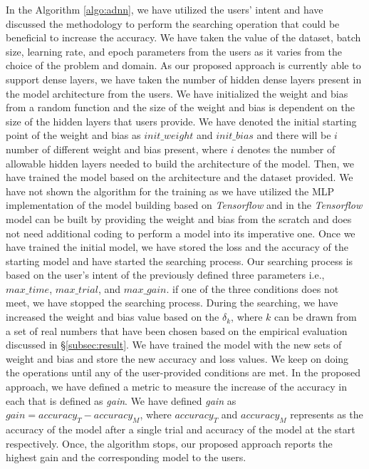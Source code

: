 In the Algorithm \ref{algo:adnn}, we have utilized the users' intent and have discussed the methodology to perform the searching operation that could be beneficial to increase the accuracy. We have taken the value of the dataset, batch size, learning rate, and epoch parameters from the users as it varies from the choice of the problem and domain. As our proposed approach is currently able to support dense layers, we have taken the number of hidden dense layers present in the model architecture from the users. We have initialized the weight and bias from a random function and the size of the weight and bias is dependent on the size of the hidden layers that users provide. We have denoted the initial starting point of the weight and bias as $init\_weight$ and $init\_bias$ and there will be $i$ number of different weight and bias present, where $i$ denotes the number of allowable hidden layers needed to build the architecture of the model. Then, we have trained the model based on the architecture and the dataset provided. We have not shown the algorithm for the training as we have utilized the MLP implementation of the model building based on \emph{Tensorflow} and in the \emph{Tensorflow} model can be built by providing the weight and bias from the scratch and does not need additional coding to perform a model into its imperative one. Once we have trained the initial model, we have stored the loss and the accuracy of the starting model and have started the searching process. Our searching process is based on the user's intent of the previously defined three parameters i.e., $max\_time$, $max\_trial$, and $max\_gain$. if one of the three conditions does not meet, we have stopped the searching process. During the searching, we have increased the weight and bias value based on the $\delta_k$, where $k$ can be drawn from a set of real numbers that have been chosen based on the empirical evaluation discussed in \S\ref{subsec:result}. We have trained the model with the new sets of weight and bias and store the new accuracy and loss values. We keep on doing the operations until any of the user-provided conditions are met. In the proposed approach, we have defined a metric to measure the increase of the accuracy in each that is defined as \emph{gain}. We have defined \emph{gain} as $gain=accuracy_{T}-accuracy_{M}$, where $accuracy_{T}$ and $accuracy_{M}$ represents as the accuracy of the model after a single trial and accuracy of the model at the start respectively. Once, the algorithm stops, our proposed approach reports the highest gain and the corresponding model to the users.
